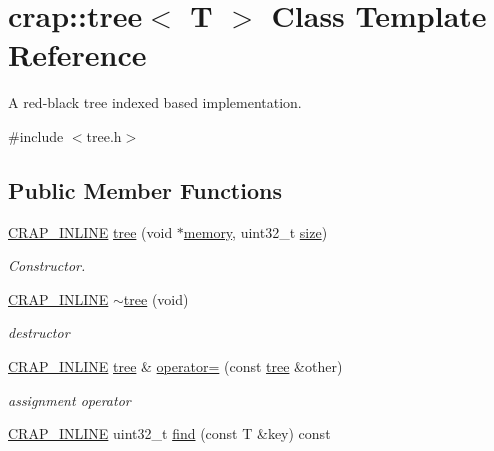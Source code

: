 \hypertarget{classcrap_1_1tree}{}\section{crap\+:\+:tree$<$ T $>$ Class Template Reference}
\label{classcrap_1_1tree}


A red-\/black tree indexed based implementation.  




{\ttfamily \#include $<$tree.\+h$>$}

\subsection*{Public Member Functions}
\begin{DoxyCompactItemize}
\item 
\hyperlink{config__x86_8h_a5a40526b8d842e7ff731509998bb0f1c}{C\+R\+A\+P\+\_\+\+I\+N\+L\+I\+N\+E} \hyperlink{classcrap_1_1tree_abc5b5f148562a70cdc7701e756357943}{tree} (void $\ast$\hyperlink{classcrap_1_1tree_a64f079b15a1560ee59595e23a550d1d3}{memory}, uint32\+\_\+t \hyperlink{classcrap_1_1tree_aeb959132fdf029c341d17b4caf21ba43}{size})
\begin{DoxyCompactList}\small\item\em Constructor. \end{DoxyCompactList}\item 
\hyperlink{config__x86_8h_a5a40526b8d842e7ff731509998bb0f1c}{C\+R\+A\+P\+\_\+\+I\+N\+L\+I\+N\+E} \hyperlink{classcrap_1_1tree_a1982fa6e379d412f25df826017838b7a}{$\sim$tree} (void)
\begin{DoxyCompactList}\small\item\em destructor \end{DoxyCompactList}\item 
\hyperlink{config__x86_8h_a5a40526b8d842e7ff731509998bb0f1c}{C\+R\+A\+P\+\_\+\+I\+N\+L\+I\+N\+E} \hyperlink{classcrap_1_1tree}{tree} \& \hyperlink{classcrap_1_1tree_a08f4cfb30183e023e833796866c79df8}{operator=} (const \hyperlink{classcrap_1_1tree}{tree} \&other)
\begin{DoxyCompactList}\small\item\em assignment operator \end{DoxyCompactList}\item 
\hyperlink{config__x86_8h_a5a40526b8d842e7ff731509998bb0f1c}{C\+R\+A\+P\+\_\+\+I\+N\+L\+I\+N\+E} uint32\+\_\+t \hyperlink{classcrap_1_1tree_acc6aa000cc88ac9ecdf88ea3a815520e}{find} (const T \&key) const 

\end{DoxyCompactItemize}
